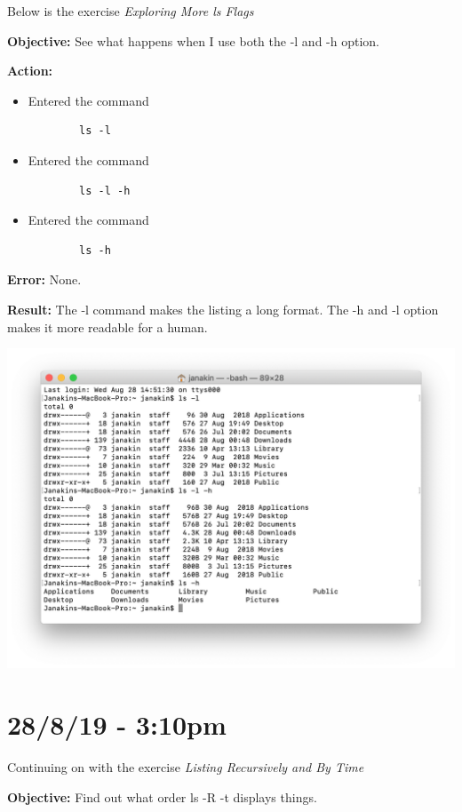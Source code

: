 \documentclass{article}
\begin{document}
Below is the exercise \textit{Exploring More ls Flags}

\textbf{Objective:} See what happens when I use both the -l and -h option.

\textbf{Action:}
\begin{itemize}
    \item Entered the command \begin{verbatim}
        ls -l
    \end{verbatim}
    \item Entered the command \begin{verbatim}
        ls -l -h
    \end{verbatim}
    \item Entered the command \begin{verbatim}
        ls -h
    \end{verbatim}
\end{itemize}

\textbf{Error:} None.

\textbf{Result:} The -l command makes the listing a long format. The -h and -l option makes it more readable for a human.

\includegraphics[width=\textwidth]{figa.png}

\section*{28/8/19 - 3:10pm}

Continuing on with the exercise \textit{Listing Recursively and By Time}

\textbf{Objective:} Find out what order ls -R -t displays things.
\end{document}
